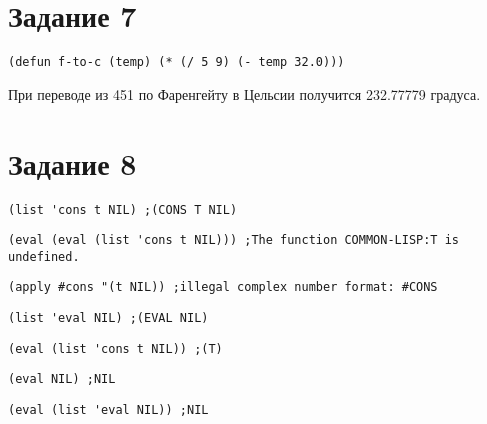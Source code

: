 \section{Задание 7}
\begin{center}
	\begin{lstlisting}[label=a7, caption={Выражение 1}]
(defun f-to-c (temp) (* (/ 5 9) (- temp 32.0)))
	\end{lstlisting}
При переводе из 451 по Фаренгейту в Цельсии получится 232.77779 градуса.
\end{center}
\section{Задание 8}
\begin{center}
	\begin{lstlisting}[label=a8, caption={Выражение 1}]
	(list 'cons t NIL) ;(CONS T NIL)
	\end{lstlisting}
	\begin{lstlisting}[label=b8, caption={Выражение 2}]
	(eval (eval (list 'cons t NIL))) ;The function COMMON-LISP:T is undefined.
	\end{lstlisting}
	\begin{lstlisting}[label=c8, caption={Выражение 3}]
	(apply #cons "(t NIL)) ;illegal complex number format: #CONS
	\end{lstlisting}
	\begin{lstlisting}[label=d8, caption={Выражение 4}]
	(list 'eval NIL) ;(EVAL NIL)
	\end{lstlisting}
	\begin{lstlisting}[label=e8, caption={Выражение 5}]
	(eval (list 'cons t NIL)) ;(T)
	\end{lstlisting}
	\begin{lstlisting}[label=f8, caption={Выражение 6}]
	(eval NIL) ;NIL
	\end{lstlisting}
	\begin{lstlisting}[label=g8, caption={Выражение 7}]
	(eval (list 'eval NIL)) ;NIL
	\end{lstlisting}
\end{center}